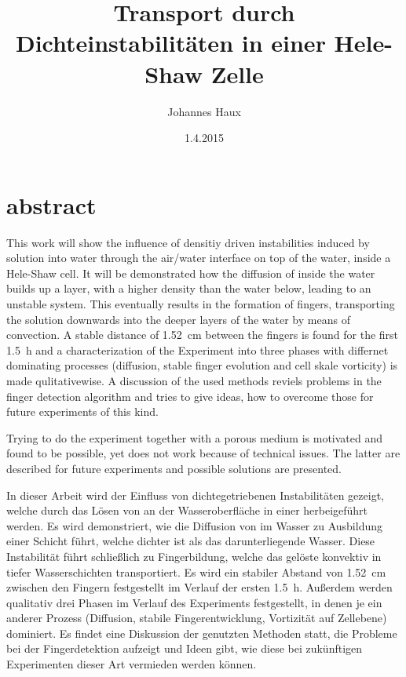 \documentclass[twoside, a4paper, DIV=11,twocolumn]{book}
\title{Transport durch Dichteinstabilitäten in einer Hele-Shaw Zelle}
\author{Johannes Haux}
\date{1.4.2015}
\begin{document}
\onecolumn


\chapter*{abstract}
 
  This work will show the influence of densitiy driven instabilities induced by \COTm solution into water through the air/water interface on top of the water, inside a Hele-Shaw cell. It will be demonstrated how the diffusion of \COT inside the water builds up a layer, with a higher density than the water below, leading to an unstable system. This eventually results in the formation of fingers, transporting the \mbox{\COTm solution} downwards into the deeper layers of the water by means of convection. A stable distance of \SI[round-precision=2]{1.52}{\centi\meter} between the fingers is found for the first \SI[round-precision=2]{1.5}{\hour} and a characterization of the Experiment into three phases with differnet dominating processes (diffusion, stable finger evolution and cell skale vorticity) is made qulitativewise.
  A discussion of the used methods reviels problems in the finger detection algorithm and tries to give ideas, how to overcome those for future experiments of this kind.
  
  Trying to do the experiment together with a porous medium is motivated and found to be possible, yet does not work because of technical issues. The latter are described for future experiments and possible solutions are presented.
  
  \vspace{1.5cm}
  In dieser Arbeit wird der Einfluss von dichtegetriebenen Instabilitäten gezeigt, welche durch das Lösen von \COT an der Wasseroberfläche in einer \HSC herbeigeführt werden. Es wird demonstriert, wie die Diffusion von \COT im Wasser zu Ausbildung einer Schicht führt, welche dichter ist als das darunterliegende Wasser. Diese Instabilität führt schließlich zu Fingerbildung, welche das gelöste \COT konvektiv in tiefer Wasserschichten transportiert. Es wird ein stabiler Abstand von \SI[round-precision=2]{1,52}{\centi\meter} zwischen den Fingern festgestellt im Verlauf der ersten \SI[round-precision=1]{1,5}{\hour}. Außerdem werden qualitativ drei Phasen im Verlauf des Experiments festgestellt, in denen je ein anderer Prozess (Diffusion, stabile Fingerentwicklung, Vortizität auf Zellebene) dominiert.
  Es findet eine Diskussion der genutzten Methoden statt, die Probleme bei der Fingerdetektion aufzeigt und Ideen gibt, wie diese bei zukünftigen Experimenten dieser Art vermieden werden können.
  
\end{document}
